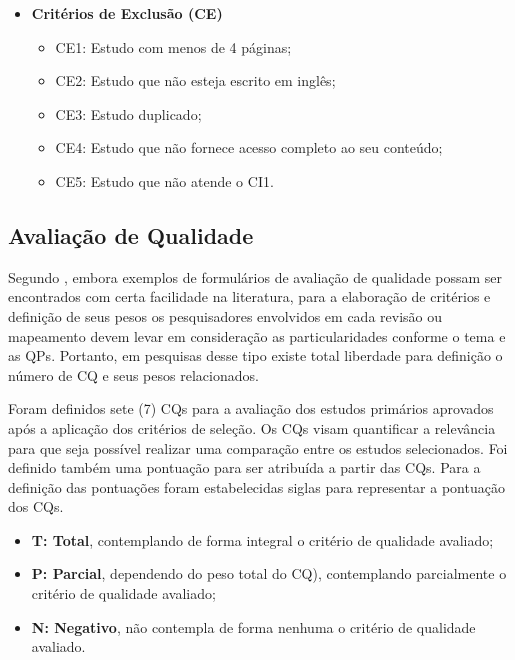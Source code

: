 \begin{itemize}
    \item \textbf{Critérios de Exclusão (\ac{CE})}
    \begin{itemize}
        \item CE1: Estudo com menos de 4 páginas;  
        \item CE2: Estudo que não esteja escrito em inglês;
        \item CE3: Estudo duplicado;
        \item CE4: Estudo que não fornece acesso completo ao seu conteúdo;
        \item CE5: Estudo que não atende o CI1.
    \end{itemize}
\end{itemize}
    
    \subsection{Avaliação de Qualidade} \label{scec:AvalQualidade}

Segundo , embora exemplos de formulários de avaliação de qualidade possam ser encontrados com certa facilidade na literatura, para a elaboração de critérios e definição de seus pesos os pesquisadores envolvidos em cada revisão ou mapeamento devem levar em consideração as particularidades conforme o tema e as \acp{QP}.
Portanto, em pesquisas desse tipo existe total liberdade para definição o número de \acs{CQ} e seus pesos relacionados. 

Foram definidos sete (7) \acp{CQ} para a avaliação dos estudos primários aprovados após a aplicação dos critérios de seleção. 
Os \acp{CQ} visam quantificar a relevância para que seja possível realizar uma comparação entre os estudos selecionados. 
Foi definido também uma pontuação para ser atribuída a partir das \acp{CQ}. 
Para a definição das pontuações foram estabelecidas siglas para representar a pontuação dos \acp{CQ}. 

\begin{itemize}
    \item \textbf{T: Total}, contemplando de forma integral o critério de qualidade avaliado;
    \item \textbf{P: Parcial}, dependendo do peso total do \ac{CQ}), contemplando parcialmente o critério de qualidade avaliado;
    \item \textbf{N: Negativo}, não contempla de forma nenhuma o critério de qualidade avaliado.
\end{itemize}


